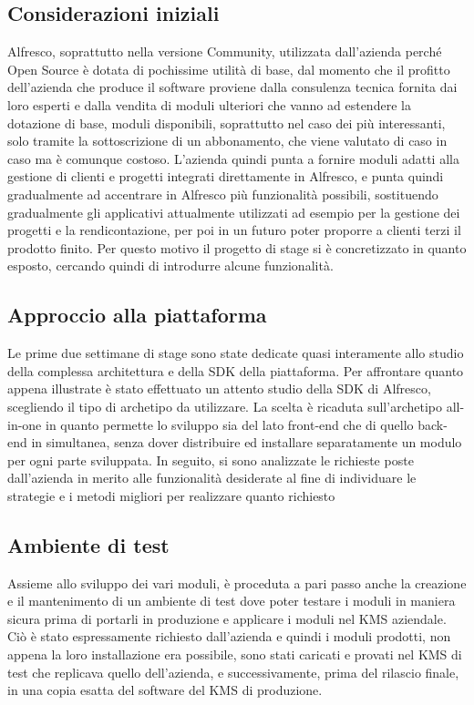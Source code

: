 \subsection{Considerazioni iniziali}
Alfresco, soprattutto nella versione Community, utilizzata dall'azienda perché Open Source è dotata di pochissime utilità di base, dal momento che il profitto dell'azienda che produce il software proviene dalla consulenza tecnica fornita dai loro esperti e dalla vendita di moduli ulteriori che vanno ad estendere la dotazione di base, moduli disponibili, soprattutto nel caso dei più interessanti, solo tramite la sottoscrizione di un abbonamento, che viene valutato di caso in caso ma è comunque costoso. L'azienda quindi punta a fornire moduli adatti alla gestione di clienti e progetti integrati direttamente in Alfresco, e punta quindi gradualmente ad accentrare in Alfresco più funzionalità possibili, sostituendo gradualmente gli applicativi attualmente utilizzati ad esempio per la gestione dei progetti e la rendicontazione, per poi in un futuro poter proporre a  clienti terzi il prodotto finito. Per questo motivo il progetto di stage si è concretizzato in quanto esposto, cercando quindi di introdurre alcune funzionalità.
\subsection{Approccio alla piattaforma}
Le prime due settimane di stage sono state dedicate quasi interamente allo studio della complessa architettura
e della SDK della piattaforma.
Per affrontare quanto appena illustrate è stato effettuato un attento studio
della SDK di Alfresco, scegliendo il tipo di archetipo da utilizzare. La scelta è
ricaduta sull’archetipo all-in-one in quanto permette lo sviluppo sia del lato front-end
che di quello back-end in simultanea, senza dover distribuire ed installare separatamente un modulo per ogni parte sviluppata.
In seguito, si sono analizzate le richieste poste dall'azienda in merito alle funzionalità desiderate al fine di individuare le strategie e i metodi migliori per realizzare quanto richiesto
\subsection{Ambiente di test}
Assieme allo sviluppo dei vari moduli, è proceduta a pari passo anche la creazione e il mantenimento di un ambiente di test dove poter testare i moduli in maniera sicura prima di portarli in produzione e applicare i moduli nel \gls{KMS} aziendale. Ciò è stato espressamente richiesto dall'azienda e quindi i moduli prodotti, non appena la loro installazione era possibile, sono stati caricati e provati nel \gls{KMS} di test che replicava quello dell'azienda, e successivamente, prima del rilascio finale, in una copia esatta del software del \gls{KMS} di produzione.
